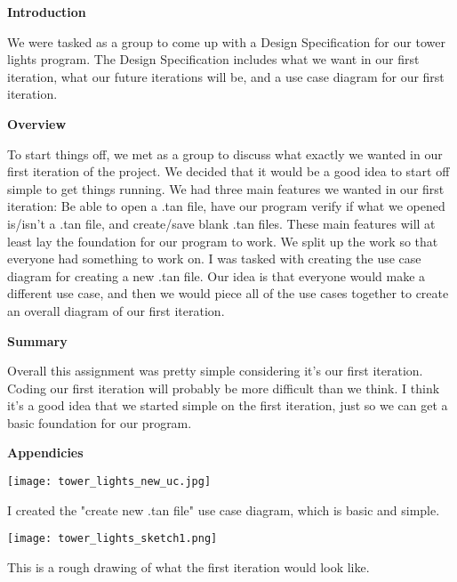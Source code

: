 \documentclass[12pt]{texMemo}
\begin{document}
\maketitle
\noindent \textbf{Introduction}
\vspace{2.5mm}

We were tasked as a group to come up with a Design Specification for our tower lights program. The Design Specification includes what we want in our first iteration, what our future iterations will be, and a use case diagram for our first iteration.

\vspace{2.5mm}
\noindent \textbf{Overview}
\vspace{2.5mm}

To start things off, we met as a group to discuss what exactly we wanted in our first iteration of the project. We decided that it would be a good idea to start off simple to get things running. We had three main features we wanted in our first iteration: Be able to open a .tan file, have our program verify if what we opened is/isn't a .tan file, and create/save blank .tan files. These main features will at least lay the foundation for our program to work. We split up the work so that everyone had something to work on. I was tasked with creating the use case diagram for creating a new .tan file. Our idea is that everyone would make a different use case, and then we would piece all of the use cases together to create an overall diagram of our first iteration.

\vspace{2.5mm}
\noindent \textbf{Summary}
\vspace{2.5mm}

Overall this assignment was pretty simple considering it's our first iteration. Coding our first iteration will probably be more difficult than we think. I think it's a good idea that we started simple on the first iteration, just so we can get a basic foundation for our program.

\vspace{2.5mm}
\noindent \textbf{Appendicies}
\vspace{2.5mm}

\texttt{[image: tower\_lights\_new\_uc.jpg]}

I created the "create new .tan file" use case diagram, which is basic and simple.

\texttt{[image: tower\_lights\_sketch1.png]}

This is a rough drawing of what the first iteration would look like.
\end{document}
